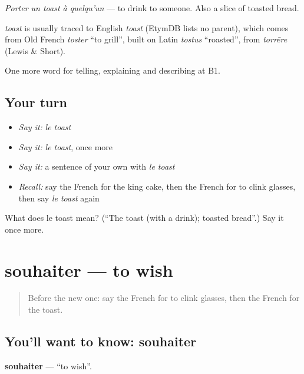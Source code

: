 \emph{Porter un toast à quelqu'un} — to drink to someone. Also a slice of toasted bread.

\begin{cousinweb}
\emph{toast} is usually traced to English \emph{toast} (EtymDB lists no parent), which comes from Old French \emph{toster} \textquotedblleft{}to grill\textquotedblright{}, built on Latin \emph{tostus} \textquotedblleft{}roasted\textquotedblright{}, from \emph{torrēre} (Lewis \& Short).
\end{cousinweb}

\begin{grammarlens}[title={What you've built}]
One more word for telling, explaining and describing at B1.
\end{grammarlens}

\subsection*{Your turn}
\begin{itemize}
\raggedright
  \item \emph{Say it:} \emph{le toast}
  \item \emph{Say it:} \emph{le toast}, once more
  \item \emph{Say it:} a sentence of your own with \emph{le toast}
  \item \emph{Recall:} say the French for the king cake, then the French for to clink glasses, then say \emph{le toast} again
\end{itemize}

\begin{tcolorbox}[breakable,colback=teal!4,colframe=teal!35!black,title={Before you move on}]
What does le toast mean? (\textquotedblleft{}The toast (with a drink); toasted bread\textquotedblright{}.) Say it once more.
\end{tcolorbox}
\section[souhaiter]{souhaiter — to wish}

\label{lesson:FR-C320-souhaiter}



\begin{quote}
Before the new one: say the French for to clink glasses, then the French for the toast.
\end{quote}

\subsection*{You'll want to know: souhaiter}
\textbf{souhaiter} — \textquotedblleft{}to wish\textquotedblright{}.

